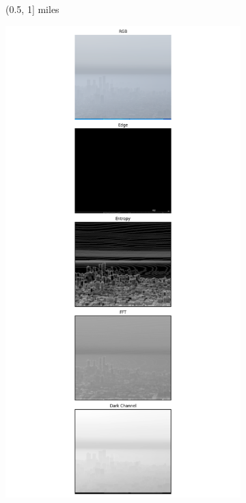 \begin{figure}
\begin{subfigure}[b]{0.15\textwidth}
    \caption{(0.5, 1] miles}
    \label{subfig:bin1}
  \end{subfigure}
    \begin{subfigure}[b]{0.15\textwidth}
      \includegraphics[width=\textwidth, trim={7.5cm 0 7.5cm 0},clip]{imgs/examples/exp_0_featuresMiles_1.8951868467819106_featuresM_3050_features.png}

\end{subfigure}
\end{figure}
